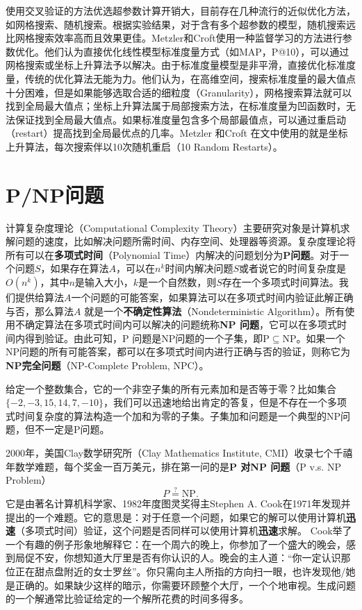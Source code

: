 使用交叉验证的方法优选超参数计算开销大，目前存在几种流行的近似优化方法，如网格搜索、随机搜索\cite{bergstra2012random}。根据\cite{bergstra2012random}实验结果，对于含有多个超参数的模型，随机搜索远比网格搜索效率高而且效果更佳。Metzler和Croft\cite{metzler2007linear}使用一种监督学习的方法进行参数优化。他们认为直接优化线性模型标准度量方式（如MAP，P@10），可以通过网格搜索或坐标上升算法予以解决。由于标准度量模型是非平滑，直接优化标准度量，传统的优化算法无能为力。他们认为，在高维空间，搜索标准度量的最大值点十分困难，但是如果能够选取合适的细粒度（Granularity），网格搜索算法就可以找到全局最大值点；坐标上升算法属于局部搜索方法，在标准度量为凹函数时，无法保证找到全局最大值点。如果标准度量包含多个局部最值点，可以通过重启动（restart）提高找到全局最优点的几率。Metzler 和Croft 在文中使用的就是坐标上升算法，每次搜索伴以10次随机重启（10 Random Restarts）。

\section{P/NP问题}
计算复杂度理论（Computational Complexity Theory）主要研究对象是计算机求解问题的速度，比如解决问题所需时间、内存空间、处理器等资源。复杂度理论将所有可以在\textbf{多项式时间}（Polynomial Time）内解决的问题划分为\textbf{P问题}。对于一个问题$S$，如果存在算法$A$，可以在$n^k$时间内解决问题$S$或者说它的时间复杂度是$O(n^k)$，其中$n$是输入大小，$k$是一个自然数，则$S$存在一个多项式时间算法。我们提供给算法$A$一个问题的可能答案，如果算法可以在多项式时间内验证此解正确与否，那么算法$A$ 就是一个\textbf{不确定性算法}（Nondeterministic Algorithm）。所有使用不确定算法在多项式时间内可以解决的问题统称\textbf{NP 问题}，它可以在多项式时间内得到验证。由此可知，P 问题是NP问题的一个子集，即P$\subseteq$NP。如果一个NP问题的所有可能答案，都可以在多项式时间内进行正确与否的验证，则称它为\textbf{NP完全问题}（NP-Complete Problem, NPC）。

\begin{example}[子集加和问题]
给定一个整数集合，它的一个非空子集的所有元素加和是否等于零？比如集合$\{-2, -3, 15, 14, 7, -10\}$，我们可以迅速地给出肯定的答复，但是不存在一个多项式时间复杂度的算法构造一个加和为零的子集。子集加和问题是一个典型的NP问题，但不一定是P问题。
\end{example}

2000年，美国Clay数学研究所（Clay Mathematics Institute, CMI）收录七个千禧年数学难题，每个奖金一百万美元，排在第一问的是\textbf{P 对NP 问题}（P v.s. NP Problem）
\[P\stackrel{?}{=} \mathrm{NP}.\]
它是由著名计算机科学家、1982年度图灵奖得主Stephen A. Cook\cite{cook1971complexity}在1971年发现并提出的一个难题。它的意思是：对于任意一个问题，如果它的解可以使用计算机\textbf{迅速}（多项式时间）验证，这个问题是否同样可以使用计算机\textbf{迅速}求解。
Cook举了一个有趣的例子形象地解释它：在一个周六的晚上，你参加了一个盛大的晚会，感到局促不安，你想知道大厅里是否有你认识的人。晚会的主人道：“你一定认识那位正在甜点盘附近的女士罗丝”。你只需向主人所指的方向扫一眼，也许发现他/她是正确的。如果缺少这样的暗示，你需要环顾整个大厅，一个个地审视。生成问题的一个解通常比验证给定的一个解所花费的时间多得多。

